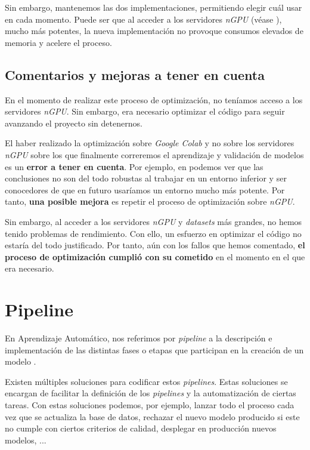 Sin embargo, mantenemos las dos implementaciones, permitiendo elegir cuál usar en cada momento. Puede ser que al acceder a los servidores \textit{nGPU} (véase ), mucho más potentes, la nueva implementación no provoque consumos elevados de memoria y acelere el proceso.

\subsection{Comentarios y mejoras a tener en cuenta}

En el momento de realizar este proceso de optimización, no teníamos acceso a los servidores \textit{nGPU}. Sin embargo, era necesario optimizar el código para seguir avanzando el proyecto sin detenernos.

El haber realizado la optimización sobre \textit{Google Colab} y no sobre los servidores \textit{nGPU} sobre los que finalmente correremos el aprendizaje y validación de modelos es un \textbf{error a tener en cuenta}. Por ejemplo, en  podemos ver que las conclusiones no son del todo robustas al trabajar en un entorno inferior y ser conocedores de que en futuro usaríamos un entorno mucho más potente. Por tanto, \textbf{una posible mejora} es repetir el proceso de optimización sobre \textit{nGPU}.

Sin embargo, al acceder a los servidores \textit{nGPU} y \textit{datasets} más grandes, no hemos tenido problemas de rendimiento. Con ello, un esfuerzo en optimizar el código no estaría del todo justificado. Por tanto, aún con los fallos que hemos comentado, \textbf{el proceso de optimización cumplió con su cometido} en el momento en el que era necesario.

\section{Pipeline} \label{isec:pipeline}

En Aprendizaje Automático, nos referimos por \textit{pipeline} a la descripción e implementación de las distintas fases o etapas que participan en la creación de un modelo \cite{informatica:pipeline_web}.

Existen múltiples soluciones para codificar estos \textit{pipelines}. Estas soluciones se encargan de facilitar la definición de los \textit{pipelines} y la automatización de ciertas tareas. Con estas soluciones podemos, por ejemplo, lanzar todo el proceso cada vez que se actualiza la base de datos, rechazar el nuevo modelo producido si este no cumple con ciertos criterios de calidad, desplegar en producción nuevos modelos, ...

